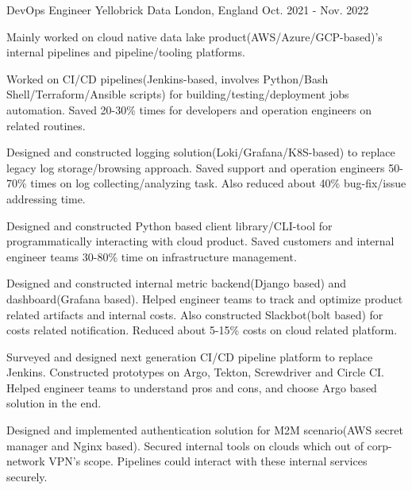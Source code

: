 \begin{cventries}
    \cventry
        {DevOps Engineer}
        {Yellobrick Data}
        {London, England}
        {Oct. 2021 - Nov. 2022}
        {
            \begin{cvitems}
                \item
                   {
                        Mainly worked on cloud native data lake product(AWS/Azure/GCP-based)'s internal pipelines and pipeline/tooling platforms.
                   }
                \item
                   {
                        Worked on CI/CD pipelines(Jenkins-based, involves Python/Bash Shell/Terraform/Ansible scripts) for building/testing/deployment jobs automation. Saved 20-30\% times for developers and operation engineers on related routines.
                   }
                \item
                    {
                        Designed and constructed logging solution(Loki/Grafana/K8S-based) to replace legacy log storage/browsing approach. Saved support and operation engineers 50-70\% times on log collecting/analyzing task. Also reduced about 40\% bug-fix/issue addressing time.
                    }
                \item
                    {
                        Designed and constructed Python based client library/CLI-tool for programmatically interacting with cloud product. Saved customers and internal engineer teams 30-80\% time on infrastructure management.
                    }
                \item
                    {
                        Designed and constructed internal metric backend(Django based) and dashboard(Grafana based). Helped engineer teams to track and optimize product related artifacts and internal costs. Also constructed Slackbot(bolt based) for costs related notification. Reduced about 5-15\% costs on cloud related platform.
                    }
                \item
                    {
                        Surveyed and designed next generation CI/CD pipeline platform to replace Jenkins. Constructed prototypes on Argo, Tekton, Screwdriver and Circle CI. Helped engineer teams to understand pros and cons, and choose Argo based solution in the end.
                    }
                \item
                    {
                        Designed and implemented authentication solution for M2M scenario(AWS secret manager and Nginx based). Secured internal tools on clouds which out of corp-network VPN's scope. Pipelines could interact with these internal services securely.
                    }
            \end{cvitems}
        }


\end{cventries}
